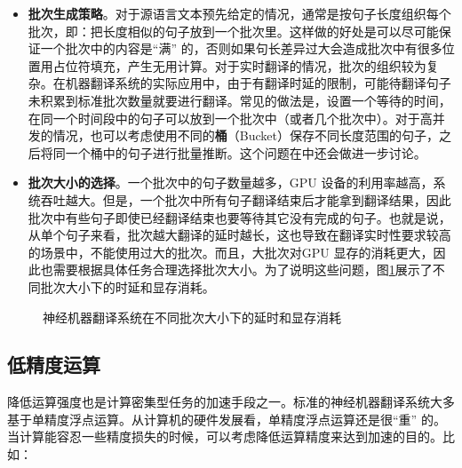 \begin{itemize}
\vspace{0.5em}
\item {\small\sffamily\bfseries{批次生成策略}}。对于源语言文本预先给定的情况，通常是按句子长度组织每个批次，即：把长度相似的句子放到一个批次里。这样做的好处是可以尽可能保证一个批次中的内容是“满” 的，否则如果句长差异过大会造成批次中有很多位置用占位符填充，产生无用计算。对于实时翻译的情况，批次的组织较为复杂。在机器翻译系统的实际应用中，由于有翻译时延的限制，可能待翻译句子未积累到标准批次数量就要进行翻译。常见的做法是，设置一个等待的时间，在同一个时间段中的句子可以放到一个批次中（或者几个批次中）。对于高并发的情况，也可以考虑使用不同的{\small\sffamily\bfseries{桶}}（Bucket）保存不同长度范围的句子，之后将同一个桶中的句子进行批量推断。这个问题在{\chaptereighteen}中还会做进一步讨论。
\vspace{0.5em}
\item {\small\sffamily\bfseries{批次大小的选择}}。一个批次中的句子数量越多，GPU 设备的利用率越高，系统吞吐越大。但是，一个批次中所有句子翻译结束后才能拿到翻译结果，因此批次中有些句子即使已经翻译结束也要等待其它没有完成的句子。也就是说，从单个句子来看，批次越大翻译的延时越长，这也导致在翻译实时性要求较高的场景中，不能使用过大的批次。而且，大批次对GPU 显存的消耗更大，因此也需要根据具体任务合理选择批次大小。为了说明这些问题，图\ref{fig:14-7}展示了不同批次大小下的时延和显存消耗。
\vspace{0.5em}
\end{itemize}

\begin{figure}[htp]
\centering

\caption{神经机器翻译系统在不同批次大小下的延时和显存消耗}
\label{fig:14-7}
\end{figure}


\subsection{低精度运算}

\parinterval 降低运算强度也是计算密集型任务的加速手段之一。标准的神经机器翻译系统大多基于单精度浮点运算。从计算机的硬件发展看，单精度浮点运算还是很“重” 的。当计算能容忍一些精度损失的时候，可以考虑降低运算精度来达到加速的目的。比如：

